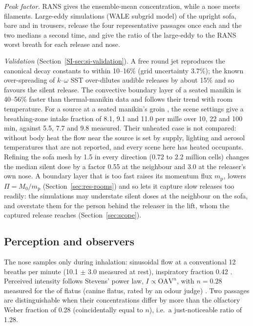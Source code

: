 \emph{Peak factor.} RANS gives the ensemble-mean concentration, while a nose meets filaments. Large-eddy simulations
(WALE subgrid model) of the upright sofa, bare and in trousers, release the four representative passages once each
and the two medians a second time, and give the ratio of the large-eddy to the RANS worst breath for each release and nose.

\emph{Validation} (Section~\ref{SI-sec:si-validation}). A free round jet reproduces the canonical decay constants
to within 10--16\% (grid uncertainty 3.7\%); the known over-spreading of $k$--$\omega$ SST over-dilutes audible
releases by about 15\% and so favours the silent release. The
convective boundary layer of a seated manikin is 40--56\% faster than thermal-manikin data \cite{licina2014} and
follows their trend with room temperature. For a source at a seated manikin's groin \cite{licina2017}, the scene
settings give a breathing-zone intake fraction of 8.1, 9.1 and 11.0 per mille over 10, 22 and 100\,min, against
5.5, 7.7 and 9.8 measured. Their unheated case is not compared: without body heat the flow near the source is set by
supply, lighting and aerosol temperatures that are not reported, and every scene here has heated occupants. Refining the sofa mesh
by 1.5 in every direction (0.72 to 2.2 million cells) changes the median silent dose by a factor 0.55 at the
neighbour and 3.0 at the releaser's own nose. A boundary layer that is too fast raises its momentum flux
$m_\mathrm{p}$, lowers $\Pi = M_0/m_\mathrm{p}$ (Section~\ref{sec:res-rooms}) and so lets it capture slow releases
too readily: the simulations may understate silent doses at the neighbour on the sofa, and overstate them for the
person behind the releaser in the lift, whom the captured release reaches (Section~\ref{sec:scope}).

\subsection{Perception and observers}
\label{sec:perception}
The nose samples only during inhalation: sinusoidal flow at a conventional 12 breaths per minute
(10.1 $\pm$ 3.0 measured at rest), inspiratory fraction 0.42 \cite{wysocki2006}. Perceived intensity follows Stevens' power law, $I \propto \mathrm{OAV}^n$, with $n = 0.28$
measured for the  of flatus (canine flatus, rated by an odour judge) \cite{collins2001}. Two passages are
distinguishable when their concentrations differ by more than the olfactory Weber fraction of 0.28
\cite{stone1965} (coincidentally equal to $n$), i.e.\ a just-noticeable ratio of 1.28.

